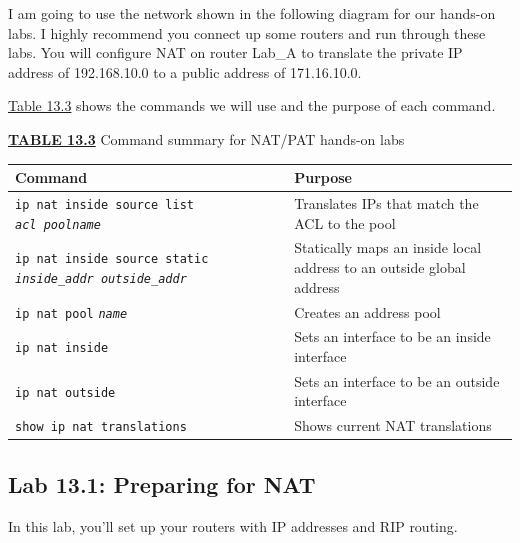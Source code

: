 \documentclass[b5paper,11pt]{memoir}
\begin{document}
I am going to use the network shown in the following diagram for our
hands-on labs. I highly recommend you connect up some routers and run
through these labs. You will configure NAT on router Lab\_A to translate
the private IP address of 192.168.10.0 to a public address of
171.16.10.0.

\begin{figure}
\centering
\caption{}
\end{figure}

\protect\hyperlink{c13.xhtmlux5cux23table13-3}{Table 13.3} shows the
commands we will use and the purpose of each command.



{\protect\hyperlink{c13.xhtmlux5cux23tableanchor13-3}{\textbf{TABLE
13.3}} Command summary for NAT/PAT hands-on labs}

\begin{longtable}[]{@{}ll@{}}
\toprule
Command & Purpose\tabularnewline
\midrule
\endhead
\texttt{ip\ nat\ inside\ source\ list}
\emph{\texttt{acl\ pool}\texttt{name}} & Translates IPs that match the
ACL to the pool\tabularnewline
\texttt{ip\ nat\ inside\ source\ static}
\emph{\texttt{inside\_addr\ outside\_addr}} & Statically maps an inside
local address to an outside global address\tabularnewline
\texttt{ip\ nat\ pool} \emph{\texttt{name}} & Creates an address
pool\tabularnewline
\texttt{ip\ nat\ inside} & Sets an interface to be an inside
interface\tabularnewline
\texttt{ip\ nat\ outside} & Sets an interface to be an outside
interface\tabularnewline
\texttt{show\ ip\ nat\ translations} & Shows current NAT
translations\tabularnewline
\bottomrule
\end{longtable}




\subsection{Lab 13.1: Preparing for NAT}

In this lab, you'll set up your routers with IP addresses and RIP
routing.
\end{document}
